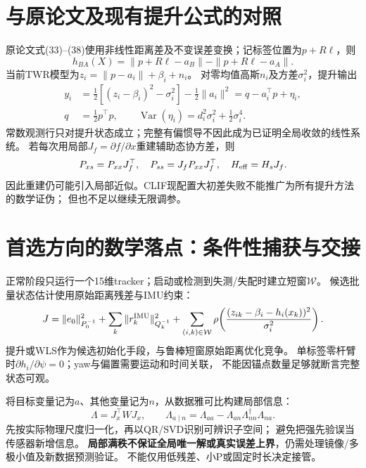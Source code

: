\documentclass[11pt,a4paper]{ctexart}
\begin{document}
\clearpage
\section{与原论文及现有提升公式的对照}
原论文式(33)--(38)使用非线性距离差及不变误差变换；记标签位置为$p+R\ell$，则
\begin{equation}
h_{BA}(X)=\|p+R\ell-a_B\|-\|p+R\ell-a_A\|.
\end{equation}
当前TWR模型为$z_i=\|p-a_i\|+\beta_i+n_i$。
对零均值高斯$n_i$及方差$\sigma_i^2$，提升输出
\begin{align}
y_i&=\tfrac12[(z_i-\beta_i)^2-\sigma_i^2]-\tfrac12\|a_i\|^2
=q-a_i^\top p+\eta_i,\\
q&=\tfrac12p^\top p,\qquad
\operatorname{Var}(\eta_i)=d_i^2\sigma_i^2+\tfrac12\sigma_i^4.
\end{align}
常数观测行只对提升状态成立；完整有偏惯导不因此成为已证明全局收敛的线性系统。
若每次用局部$J_f=\partial f/\partial x$重建辅助态协方差，则
\begin{equation}
P_{xs}=P_{xx}J_f^\top,\quad P_{ss}=J_fP_{xx}J_f^\top,
\quad H_{\rm eff}=H_sJ_f.
\end{equation}
因此重建仍可能引入局部近似。CLIF现配置大初差失败不能推广为所有提升方法的数学证伪；
但也不足以继续无限调参。

\section{首选方向的数学落点：条件性捕获与交接}
正常阶段只运行一个15维tracker；启动或检测到失测/失配时建立短窗$\mathcal W$。
候选批量状态估计使用原始距离残差与IMU约束：
\begin{equation}
J=\|e_0\|_{P_0^{-1}}^2+\sum_k\|r_k^{\rm IMU}\|_{Q_k^{-1}}^2
+\sum_{(i,k)\in\mathcal W}\rho\!\left(
\frac{(z_{ik}-\beta_i-h_i(x_k))^2}{\sigma_i^2}\right).
\end{equation}
提升或WLS作为候选初始化手段，与鲁棒短窗原始距离优化竞争。
单标签零杆臂时$\partial h_i/\partial\psi=0$；yaw与偏置需要运动和时间关联，
不能因锚点数量足够就断言完整状态可观。

将目标变量记为$a$、其他变量记为$n$，从数据雅可比构建局部信息：
\begin{equation}
\Lambda=J_x^\top WJ_x,\qquad
\Lambda_{a\mid n}=\Lambda_{aa}-\Lambda_{an}\Lambda_{nn}^{\dagger}\Lambda_{na}.
\end{equation}
先按实际物理尺度归一化，再以QR/SVD识别可辨识子空间；
避免把强先验误当传感器新增信息。
\textbf{局部满秩不保证全局唯一解或真实误差上界}，仍需处理镜像/多极小值及新数据预测验证。
不能仅用低残差、小P或固定时长决定接管。
\end{document}
